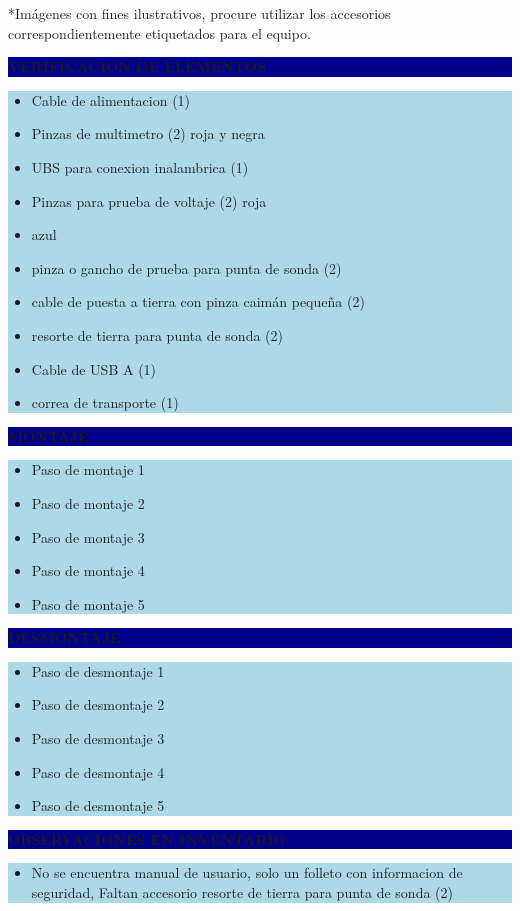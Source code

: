 \documentclass[11pt]{article}
\newcommand{\seccionbanda}[1]{%
  \vspace{0.6em}
  \noindent\colorbox{darkblue}{\parbox{\dimexpr\linewidth-2\fboxsep}{%
    \centering\color{white}\bfseries #1}}\par\vspace{0.6em}
}
\begin{document}
\vspace{0.5em}
\footnotesize{*Imágenes con fines ilustrativos, procure utilizar los accesorios correspondientemente etiquetados para el equipo.}
\normalsize

\newpage
\seccionbanda{VERIFICACIÓN DE ELEMENTOS}
\noindent\colorbox{lightblue}{\parbox{\dimexpr\linewidth-2\fboxsep\relax}{%
\begin{itemize}[label=$\square$, itemsep=4pt]
\item Cable de alimentacion (1)
\item Pinzas de multimetro (2) roja y negra
\item UBS para conexion inalambrica (1)
\item Pinzas para prueba de voltaje (2) roja
\item azul
\item pinza o gancho de prueba para punta de sonda (2)
\item cable de puesta a tierra con pinza caimán pequeña (2)
\item resorte de tierra para punta de sonda (2)
\item Cable de USB A (1)
\item correa de transporte (1)
\end{itemize}
}}\par

\seccionbanda{MONTAJE}
\noindent\colorbox{lightblue}{\parbox{\dimexpr\linewidth-2\fboxsep\relax}{%
\begin{itemize}[label=$\square$, itemsep=4pt]
\item Paso de montaje 1
\item Paso de montaje 2
\item Paso de montaje 3
\item Paso de montaje 4
\item Paso de montaje 5
\end{itemize}
}}\par

\seccionbanda{DESMONTAJE}
\noindent\colorbox{lightblue}{\parbox{\dimexpr\linewidth-2\fboxsep\relax}{%
\begin{itemize}[label=$\square$, itemsep=4pt]
\item Paso de desmontaje 1
\item Paso de desmontaje 2
\item Paso de desmontaje 3
\item Paso de desmontaje 4
\item Paso de desmontaje 5
\end{itemize}
}}\par
\seccionbanda{OBSERVACIONES EN INVENTARIO}
\noindent\colorbox{lightblue}{\parbox{\dimexpr\linewidth-2\fboxsep\relax}{\begin{itemize}[itemsep=4pt]
\item No se encuentra manual de usuario, solo un folleto con informacion de seguridad, Faltan accesorio resorte de tierra para punta de sonda (2)
\end{itemize}}}\par
\end{document}
